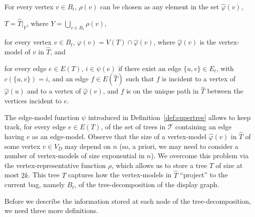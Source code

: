 \begin{tight_enumerate}
\item [$\bullet$] For every vertex $v \in B_t$, $\rho(v)$ can be chosen as any element in the set $\widehat{\varphi}(v)$,
\item [$\bullet$] $T=\widehat{T}|_Y$, where $Y = \underset{v \in B_t}{\bigcup} \rho(v)$,
\item [$\bullet$] for every vertex $v \in B_t$, $\varphi(v) = V(T) \cap \widehat{\varphi}(v)$,  where $\widehat{\varphi}(v)$ is the vertex-model of $v$ in $\widehat{T}$, and
\item[$\bullet$]  for every edge $e\in E(T)$,
$i\in \psi(e)$ if
there exist an edge $\{u,v\}\in E_t$, with  $c(\{u,v\})=i$, and
an edge $f\in E(\widehat{T})$
such that $f$ is incident to a vertex of $\widehat{\varphi}(u)$ and to a vertex of $\widehat{\varphi}(v)$, and
$f$ is on the unique path  in $\widehat{T}$ between the vertices incident to $e$.
\end{tight_enumerate}

\vspace{-.15cm}
The edge-model function $\psi$ introduced in Definition~\ref{def:supertree} allows to keep track, for every edge $e\in E(T)$, of the set of trees in $\mathcal{T}$ containing an edge having $e$ as an edge-model.
Observe that the size of a vertex-model $\widehat{\varphi}(v)$ in $\widehat{T}$ of some vertex $v\in V_D$ may depend on $n$ (so, a priori,  we may need to consider a number of vertex-models of size exponential in $n$). We overcome this problem via the vertex-representative function $\rho$, which allows us to store a tree $T$ of size at most $2k$. This tree $T$ captures how the vertex-models in $\widehat{T}$ ``project'' to the current bag, namely $B_t$, of the tree-decomposition of the display graph.








Before we describe the information stored at each node of the tree-decomposition, we need three more definitions.

